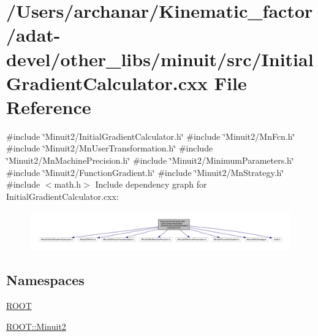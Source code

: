 \hypertarget{adat-devel_2other__libs_2minuit_2src_2InitialGradientCalculator_8cxx}{}\section{/\+Users/archanar/\+Kinematic\+\_\+factor/adat-\/devel/other\+\_\+libs/minuit/src/\+Initial\+Gradient\+Calculator.cxx File Reference}
\label{adat-devel_2other__libs_2minuit_2src_2InitialGradientCalculator_8cxx}
{\ttfamily \#include \char`\"{}Minuit2/\+Initial\+Gradient\+Calculator.\+h\char`\"{}}\newline
{\ttfamily \#include \char`\"{}Minuit2/\+Mn\+Fcn.\+h\char`\"{}}\newline
{\ttfamily \#include \char`\"{}Minuit2/\+Mn\+User\+Transformation.\+h\char`\"{}}\newline
{\ttfamily \#include \char`\"{}Minuit2/\+Mn\+Machine\+Precision.\+h\char`\"{}}\newline
{\ttfamily \#include \char`\"{}Minuit2/\+Minimum\+Parameters.\+h\char`\"{}}\newline
{\ttfamily \#include \char`\"{}Minuit2/\+Function\+Gradient.\+h\char`\"{}}\newline
{\ttfamily \#include \char`\"{}Minuit2/\+Mn\+Strategy.\+h\char`\"{}}\newline
{\ttfamily \#include $<$math.\+h$>$}\newline
Include dependency graph for Initial\+Gradient\+Calculator.\+cxx\+:
\nopagebreak
\begin{figure}[H]
\begin{center}
\leavevmode
\includegraphics[width=350pt]{dc/d25/adat-devel_2other__libs_2minuit_2src_2InitialGradientCalculator_8cxx__incl}
\end{center}
\end{figure}
\subsection*{Namespaces}
\begin{DoxyCompactItemize}
\item 
 \mbox{\hyperlink{namespaceROOT}{R\+O\+OT}}
\item 
 \mbox{\hyperlink{namespaceROOT_1_1Minuit2}{R\+O\+O\+T\+::\+Minuit2}}
\end{DoxyCompactItemize}
